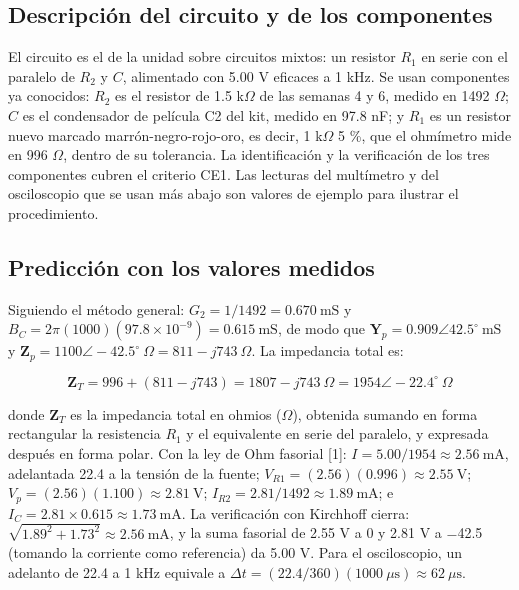 \documentclass[11pt,letterpaper]{article}
\begin{document}
\subsection{Descripción del circuito y de los componentes}

El circuito es el de la unidad sobre circuitos mixtos: un resistor $R_1$ en serie con el paralelo de $R_2$ y $C$, alimentado con 5.00 V eficaces a 1 kHz. Se usan componentes ya conocidos: $R_2$ es el resistor de 1.5 k\ensuremath{\Omega} de las semanas 4 y 6, medido en 1492 \ensuremath{\Omega}; $C$ es el condensador de película C2 del kit, medido en 97.8 nF; y $R_1$ es un resistor nuevo marcado marrón-negro-rojo-oro, es decir, 1 k\ensuremath{\Omega} \textpm{}5 \%, que el ohmímetro mide en 996 \ensuremath{\Omega}, dentro de su tolerancia. La identificación y la verificación de los tres componentes cubren el criterio CE1. Las lecturas del multímetro y del osciloscopio que se usan más abajo son valores de ejemplo para ilustrar el procedimiento.

\subsection{Predicción con los valores medidos}

Siguiendo el método general: $G_2 = 1/1492 = 0.670\ \text{mS}$ y $B_C = 2\pi(1000)(97.8 \times 10^{-9}) = 0.615\ \text{mS}$, de modo que $\mathbf{Y}_p = 0.909 \angle 42.5^\circ\ \text{mS}$ y $\mathbf{Z}_p = 1100 \angle -42.5^\circ\ \Omega = 811 - j743\ \Omega$. La impedancia total es:

\begin{equation}
  \mathbf{Z}_T = 996 + (811 - j743) = 1807 - j743\ \Omega = 1954 \angle -22.4^\circ\ \Omega
\end{equation}

donde $\mathbf{Z}_T$ es la impedancia total en ohmios (\ensuremath{\Omega}), obtenida sumando en forma rectangular la resistencia $R_1$ y el equivalente en serie del paralelo, y expresada después en forma polar. Con la ley de Ohm fasorial [1]: $I = 5.00/1954 \approx 2.56\ \text{mA}$, adelantada 22.4\textdegree{} a la tensión de la fuente; $V_{R1} = (2.56)(0.996) \approx 2.55\ \text{V}$; $V_p = (2.56)(1.100) \approx 2.81\ \text{V}$; $I_{R2} = 2.81/1492 \approx 1.89\ \text{mA}$; e $I_C = 2.81 \times 0.615 \approx 1.73\ \text{mA}$. La verificación con Kirchhoff cierra: $\sqrt{1.89^2 + 1.73^2} \approx 2.56\ \text{mA}$, y la suma fasorial de 2.55 V a 0\textdegree{} y 2.81 V a \ensuremath{-}42.5\textdegree{} (tomando la corriente como referencia) da 5.00 V. Para el osciloscopio, un adelanto de 22.4\textdegree{} a 1 kHz equivale a $\Delta t = (22.4/360)(1000\ \mu\text{s}) \approx 62\ \mu\text{s}$.
\end{document}
